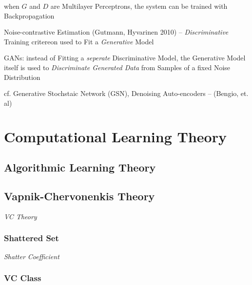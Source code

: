 when $G$ and $D$ are Multilayer Perceptrons, the system can be trained with
Backpropagation

Noise-contrastive Estimation (Gutmann, Hyvarinen 2010) --
\emph{Discriminative} Training critereon used to Fit a \emph{Generative} Model

GANs: instead of Fitting a \emph{seperate} Discriminative Model, the Generative
Model itself is used to \emph{Discriminate Generated Data} from Samples of a
fixed Noise Distribution

cf. Generative Stochstaic Network (GSN), Denoising Auto-encoders --
(Bengio, et. al)



\section{Computational Learning Theory}\label{sec:computational_learning_theory}




\subsection{Algorithmic Learning Theory}\label{sec:algorithmic_learning}

\subsection{Vapnik-Chervonenkis Theory}\label{sec:vc_theory}

\emph{VC Theory}



\subsubsection{Shattered Set}\label{sec:shattered_set}

\emph{Shatter Coefficient}



\subsubsection{VC Class}\label{sec:vc_class}

